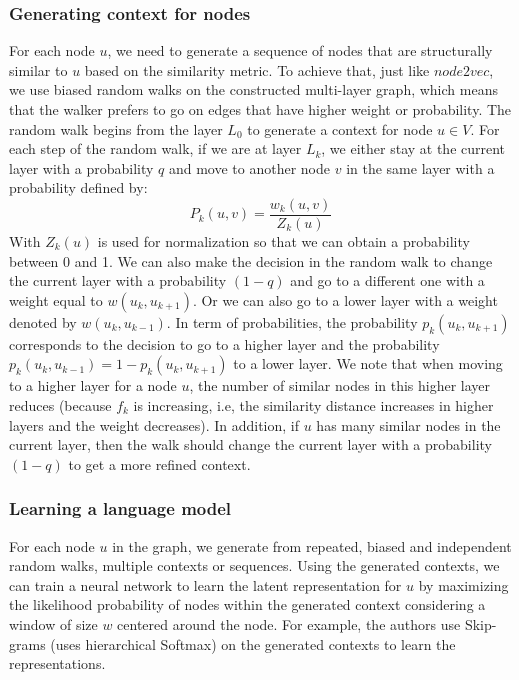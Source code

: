 \documentclass[a4paper,13pt]{article}
\begin{document}
\subsubsection{Generating context for nodes}
For each node $u$, we need to generate a sequence of nodes that are structurally similar to $u$ based on the similarity metric. To achieve that, just like $node2vec$, we use biased random walks on the constructed multi-layer graph, which means that the walker prefers to go on edges that have higher weight or probability.
The random walk begins from the layer $L_{0}$ to generate a context for node $u \in V$. For each step of the random walk, if we are at layer $L_{k}$, we either stay at the current layer with a probability $q$ and move to another node $v$ in the same layer with a probability defined by:
\begin{equation*}
P_{k}(u,v) = \frac{w_{k}(u,v) }{Z_{k}(u)}
\end{equation*}
With $Z_{k}(u)$ is used for normalization so that we can obtain a probability between 0 and 1. We can also make the decision in the random walk to change the current layer with a probability $(1 - q)$ and go to a different one with a weight equal to $ w(u_{k},u_{k+1})$. Or we can also go to a lower layer with a weight denoted by $ w(u_{k},u_{k-1})$.  In term of probabilities, the probability $p_{k}(u_{k},u_{k+1})$ corresponds to the decision to go to a higher layer and the probability $ p_{k}(u_{k},u_{k-1}) = 1 - p_{k}(u_{k},u_{k+1})$ to a lower layer. We note that when moving to a higher layer for a node $u$, the number of similar nodes in this higher layer reduces (because $f_{k}$ is increasing, i.e, the similarity distance increases in higher layers and the weight decreases). In addition, if $u$ has many similar nodes in the current layer, then the walk should change the current layer with a probability $(1 - q)$ to get a more refined context. 
\subsubsection{Learning a language model}
For each node $u$ in the graph, we generate from repeated, biased and independent random walks, multiple contexts or sequences. Using the generated contexts, we can train a neural network to learn the latent representation for $u$ by maximizing the likelihood probability of nodes within the generated context considering a window of size $w$ centered around the node. For example, the authors use Skip-grams (uses hierarchical Softmax) on the generated contexts to learn the representations.
\end{document}
